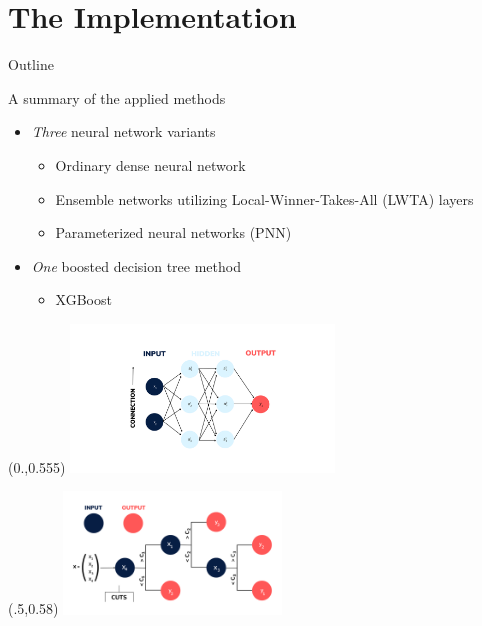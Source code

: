 \documentclass[UKenglish]{beamer}
\begin{document}
\section{The Implementation}
\begin{frame}{Outline}
    \tableofcontents[currentsection]
\end{frame}

\begin{frame}{A summary of the applied methods}
    \begin{itemize}

    \item \emph{Three} neural network variants
    \begin{itemize}
        \item Ordinary dense neural network
        \item Ensemble networks utilizing Local-Winner-Takes-All (LWTA) layers
        \item Parameterized neural networks (PNN)
    \end{itemize}

    \item \emph{One} boosted decision tree method
    \begin{itemize}
        \item XGBoost
    \end{itemize}

    \end{itemize}

    \begin{textblock}{1}(0.,0.555)
        \includegraphics[width=0.525\textwidth]{figures/Input_labels.png}
    \end{textblock}
    \begin{textblock}{1}(.5,0.58)
        \includegraphics[width=0.435\textwidth]{figures/DT.png}
    \end{textblock}
\end{frame}
\end{document}
